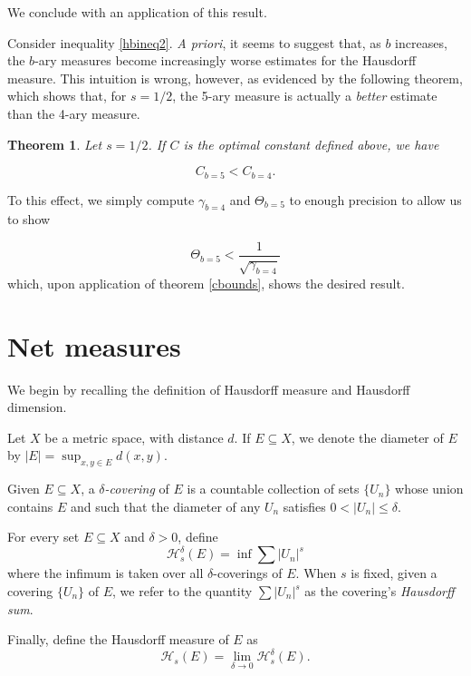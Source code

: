 \documentclass[11pt, reqno]{amsart}
\newcommand{\HH}{\mathcal{H}}
\newtheorem{theorem}{Theorem}
\begin{document}
We conclude with an application of this result.

Consider inequality \eqref{hbineq2}. \emph{A priori}, it seems to suggest that, as $b$ increases, the $b$-ary measures become increasingly worse estimates for the Hausdorff measure. This intuition is wrong, however, as evidenced by the following theorem, which shows that, for $s = 1/2$, the 5-ary measure is actually a \emph{better} estimate than the 4-ary measure.

\begin{theorem}
Let $s = 1/2$. If $C$ is the optimal constant defined above, we have

\[C_{b = 5} < C_{b = 4}.\]
\end{theorem}

To this effect, we simply compute $\gamma_{b = 4}$ and $\Theta_{b = 5}$ to enough precision to allow us to show

\[\Theta_{b = 5} < \frac 1 {\sqrt{\gamma_{b = 4}}}\]
which, upon application of theorem \ref{cbounds}, shows the desired result.

\section{Net measures}

We begin by recalling the definition of Hausdorff measure and Hausdorff dimension.

Let $X$ be a metric space, with distance $d$. If $E \subseteq X$, we denote the diameter of $E$ by $\lvert E \rvert = \sup_{x, y \in E} d(x,y)$.

Given $E \subseteq X$, a \emph{$\delta$-covering} of $E$ is a countable collection of sets $\{U_n\}$ whose union contains $E$ and such that the diameter of any $U_n$ satisfies $0 < \lvert U_n \rvert \leq \delta$.

For every set $E \subseteq X$ and $\delta > 0$, define
\begin{equation}\label{hausdorffdeltadef}
\HH_s^\delta(E) = \inf \sum \lvert U_n \rvert^s
\end{equation}
where the infimum is taken over all $\delta$-coverings of $E$. When $s$ is fixed, given a covering $\{U_n\}$ of $E$, we refer to the quantity $\sum \lvert U_n \rvert^s$ as the covering's \emph{Hausdorff sum}.

Finally, define the Hausdorff measure of $E$ as
\begin{equation}\label{hausdorffdef}
\HH_s(E) = \lim_{\delta \to 0} \HH_s^\delta(E).
\end{equation}
\end{document}
